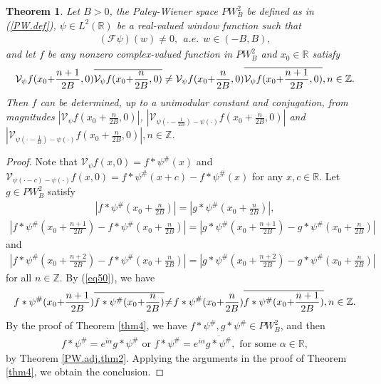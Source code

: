 \documentclass[12pt,oneside,reqno]{amsart}
\newtheorem{theorem}{Theorem}[section]
\newcommand{\Z}{\mathbb{Z}}
\newcommand{\R}{\mathbb{R}}
\numberwithin{equation}{section}
\begin{document}
\begin{theorem}\label{thm6}
	Let $B>0$, the Paley-Wiener space $PW_B^2$ be defined as in (\ref{PW.def}), $\psi\in L^2(\R)$ be a real-valued window function such that
	\begin{align*}
		(\mathcal{F} \psi) (w) \ne 0 , \  \ a.e. \  \ w \in (-B,B),
	\end{align*}
	and let $f$ be any nonzero complex-valued function in $PW_B^2$ and $x_0\in \R$ satisfy
	\begin{align}\label{eq50}
		\mathcal{V}_{\psi} f (x_0 \hskip-.03in + \hskip-.03in \frac{n+1}{2B},0) \overline{\mathcal{V}_{\psi} f (x_0 \hskip-.03in + \hskip-.03in \frac{n}{2B},0)} \ne \mathcal{V}_{\psi} f (x_0 \hskip-.03in + \hskip-.03in \frac{n}{2B},0) \overline{\mathcal{V}_{\psi} f (x_0 \hskip-.03in + \hskip-.03in \frac{n+1}{2B},0)} ,  n\in \Z.
	\end{align}
	Then $f$ can be determined, up to a unimodular constant and conjugation, from magnitudes  $ |\mathcal{V}_{\psi} f (x_0+\frac{n}{2B},0)|$, $|\mathcal{V}_{\psi(\cdot-\frac{1}{2B})-\psi(\cdot)} f (x_0+\frac{n}{2B},0)|$ and $|\mathcal{V}_{\psi(\cdot-\frac{1}{B})-\psi(\cdot)} f (x_0+\frac{n}{2B},0)|, n\in \Z$.
\end{theorem}
\begin{proof}
	Note that $\mathcal{V}_{\psi} f(x,0) = f\ast \psi^\# (x)$ and $\mathcal{V}_{\psi(\cdot-c)-\psi(\cdot)} f(x,0) = f\ast \psi^\# (x+c) - f\ast \psi^\# (x)$ for any $x,c\in \R$.
	Let $g\in PW_B^2$ satisfy
	\begin{align*}
		|f\ast \psi^\# (x_0+\frac{n}{2B})| = |g\ast \psi^\# (x_0+\frac{n}{2B})|,
	\end{align*}
	\begin{align*}
		|f\ast \psi^\# (x_0+\frac{n+1}{2B}) - f\ast \psi^\# (x_0+\frac{n}{2B})| = |g\ast \psi^\# (x_0+\frac{n+1}{2B}) - g\ast \psi^\# (x_0+\frac{n}{2B})|
	\end{align*}
	and
	\begin{align*}
		|f\ast \psi^\# (x_0+\frac{n+2}{2B}) - f\ast \psi^\# (x_0+\frac{n}{2B})| = |g\ast \psi^\# (x_0+\frac{n+2}{2B}) - g\ast \psi^\# (x_0+\frac{n}{2B})|
	\end{align*}
	for all $n\in \Z$.
	By (\ref{eq50}), we have
	\begin{align*}
		f\ast \psi^\# (x_0 \hskip-.03in + \hskip-.03in \frac{n+1}{2B}) \overline{f\ast \psi^\# (x_0 \hskip-.03in + \hskip-.03in \frac{n}{2B})} \hskip-.03in \ne \hskip-.03in f\ast \psi^\# (x_0 \hskip-.03in + \hskip-.03in \frac{n}{2B}) \overline{f\ast \psi^\# (x_0 \hskip-.03in + \hskip-.03in \frac{n+1}{2B})} , n\in \Z.
	\end{align*}
	By the proof of Theorem \ref{thm4}, we have $f\ast \psi^\#, g\ast \psi^\# \in PW_B^2$, and then
	\begin{align*}
		f\ast \psi^\# = e^{i\alpha} g\ast \psi^\# \text{ or } f\ast \psi^\# = e^{i\alpha} \overline{g\ast \psi^\#}, \text{ for some } \alpha\in \R, 
	\end{align*}
	by Theorem \ref{PW.adj.thm2}. 
	Applying the arguments in the proof of Theorem \ref{thm4}, we obtain the conclusion.
\end{proof}
\end{document}
